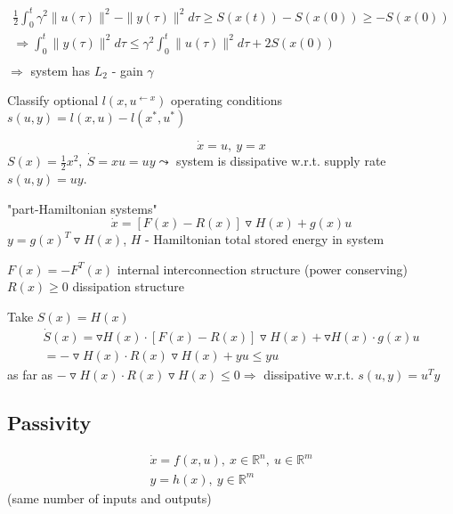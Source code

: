 \begin{equation*}
\begin{split}
\frac{1}{2} \int_0^t \gamma^2 \|u(\tau)\|^2 - \|y(\tau)\|^2d\tau \geq S(x(t)) - S(x(0)) \geq -S(x(0)) \\
\Rightarrow \int_0^t \|y(\tau)\|^2d\tau \leq \gamma^2 \int_0^t \|u(\tau)\|^2d\tau + 2 S(x(0)) \\
\end{split}
\end{equation*}
$\Rightarrow$ system has $L_2$ - gain $\gamma$

Classify optional $l(x,u^{\leftarrow x})$ operating conditions $s(u,y) = l(x,u) - l(x^*,u^*)$ 


\begin{Example}
\begin{equation*}
\dot{x} = u, \ y = x 
\end{equation*}
$S(x) = \frac{1}{2}x^2, \ \dot{S} = xu = uy \leadsto $ system is dissipative w.r.t. supply rate $s(u,y) = uy$.
\end{Example}

\begin{Example}
"part-Hamiltonian systems" 
\begin{equation*}
\dot{x} = [F(x) - R(x)] \triangledown H(x) + g(x)u
\end{equation*}
$y = g(x)^T\triangledown H(x)$, $H$ - Hamiltonian total stored energy in system

$F(x) = -F^T(x)$ internal interconnection structure (power conserving) $R(x) \geq 0$ dissipation structure

Take $S(x) = H(x)$
\begin{equation*}
\begin{split}
\dot{S}(x) = \triangledown H(x) \cdot [F(x) -R(x)]\triangledown H(x) + \triangledown H(x) \cdot g(x)u \\
= - \triangledown H(x) \cdot R(x) \triangledown H(x) + yu \leq yu 
\end{split}
\end{equation*}
as far as $- \triangledown H(x) \cdot R(x) \triangledown H(x) \leq 0 \Rightarrow$ dissipative w.r.t. $s(u,y) = u^Ty$   
\end{Example}

\subsection{Passivity}

\begin{equation}\label{passivity_system}
\begin{split}
\dot{x} = f(x,u), \ x \in \mathbb{R}^n, \ u \in \mathbb{R}^m \\
y = h(x), \ y \in \mathbb{R}^m
\end{split}
\end{equation}
(same number of inputs and outputs)

